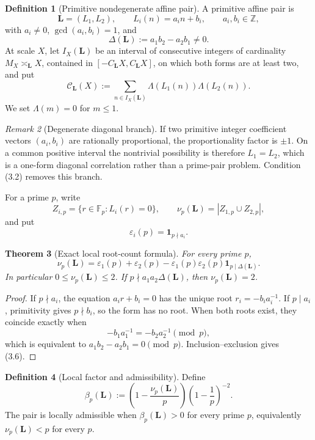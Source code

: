 \documentclass[11pt]{article}
\newtheorem{theorem}{Theorem}[section]
\theoremstyle{definition}
\newtheorem{definition}[theorem]{Definition}
\theoremstyle{remark}
\newtheorem{remark}[theorem]{Remark}
\newcommand{\Z}{\mathbb Z}
\newcommand{\F}{\mathbb F}
\newcommand{\one}{\mathbf 1}
\newcommand{\abs}[1]{\left\lvert#1\right\rvert}
\begin{document}
\begin{definition}[Primitive nondegenerate affine pair]
\label{def:primitive-pair}
A primitive affine pair is
\[
 \bm L=(L_1,L_2),
 \qquad L_i(n)=a_i n+b_i,
 \qquad a_i,b_i\in\Z,
 \tag{3.1}
\]
with $a_i\ne0$, $\gcd(a_i,b_i)=1$, and
\[
 \boxed{\Delta(\bm L):=a_1b_2-a_2b_1\ne0.}
 \tag{3.2}
\]
At scale $X$, let $I_X(\bm L)$ be an interval of consecutive integers of
cardinality $M_X\asymp_{\bm L}X$, contained in
$[-C_{\bm L}X,C_{\bm L}X]$, on which both forms are at least two, and put
\[
 \mathcal C_{\bm L}(X)
 :=\sum_{n\in I_X(\bm L)}\Lambda(L_1(n))\Lambda(L_2(n)).
 \tag{3.3}
\]
We set $\Lambda(m)=0$ for $m\le1$.
\end{definition}

\begin{remark}[Degenerate diagonal branch]
If two primitive integer coefficient vectors $(a_i,b_i)$ are rationally
proportional, the proportionality factor is $\pm1$.  On a common positive
interval the nontrivial possibility is therefore $L_1=L_2$, which is a
one-form diagonal correlation rather than a prime-pair problem.  Condition
\textup{(3.2)} removes this branch.
\end{remark}

For a prime $p$, write
\[
 Z_{i,p}=\{r\in\F_p:L_i(r)=0\},
 \qquad
 \nu_p(\bm L)=\abs{Z_{1,p}\cup Z_{2,p}},
 \tag{3.4}
\]
and put
\[
 \varepsilon_i(p)=\one_{p\nmid a_i}.
 \tag{3.5}
\]

\begin{theorem}[Exact local root-count formula]
\label{thm:root-count}
For every prime $p$,
\[
 \boxed{
 \nu_p(\bm L)
 =\varepsilon_1(p)+\varepsilon_2(p)
 -\varepsilon_1(p)\varepsilon_2(p)\one_{p\mid\Delta(\bm L)}.}
 \tag{3.6}
\]
In particular $0\le\nu_p(\bm L)\le2$.  If
$p\nmid a_1a_2\Delta(\bm L)$, then $\nu_p(\bm L)=2$.
\end{theorem}

\begin{proof}
If $p\nmid a_i$, the equation $a_i r+b_i=0$ has the unique root
$r_i=-b_i a_i^{-1}$.  If $p\mid a_i$, primitivity gives $p\nmid b_i$, so the
form has no root.  When both roots exist, they coincide exactly when
\[
 -b_1a_1^{-1}=-b_2a_2^{-1}\pmod p,
\]
which is equivalent to $a_1b_2-a_2b_1=0\pmod p$.  Inclusion--exclusion gives
\textup{(3.6)}.
\end{proof}

\begin{definition}[Local factor and admissibility]
\label{def:local-factor}
Define
\[
 \boxed{
 \beta_p(\bm L)
 :=\left(1-\frac{\nu_p(\bm L)}p\right)
   \left(1-\frac1p\right)^{-2}.}
 \tag{3.7}
\]
The pair is locally admissible when $\beta_p(\bm L)>0$ for every prime $p$,
equivalently $\nu_p(\bm L)<p$ for every $p$.
\end{definition}
\end{document}
